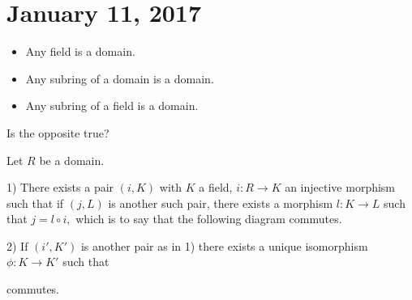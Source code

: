 \section{January 11, 2017}
\begin{rmk} \hspace{0.5cm}
\begin{itemize}
        \item Any field is a domain.
        \item Any subring of a domain is a domain.
        \item Any subring of a field is a domain.
    \end{itemize}
Is the opposite true?
\end{rmk}
\begin{thm} \label{Thm 1, Jan 11}
Let $R$ be a domain.

1) There exists a pair $(i,K)$ with $K$ a field, $i:R\rightarrow K$ an injective morphism such that if $(j,L)$ is another such pair, there exists a morphism $l:K\rightarrow L$ such that $j=l\circ i,$ which is to say that the following diagram commutes.


2) If $(i',K')$ is another pair as in 1) there exists a unique isomorphism $\phi:K\rightarrow K'$ such that

 commutes.

\end{thm}

